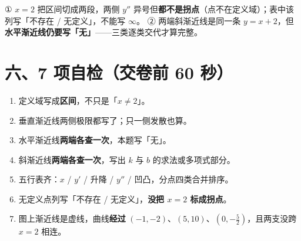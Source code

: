 \documentclass[11pt,a4paper]{ctexart}
\begin{document}
\begin{keypoint}[本题两个必踩的给分点]
① $x=2$ 把区间切成两段，两侧 $y''$ 异号但\textbf{都不是拐点}（点不在定义域）；表中该列写「不存在 / 无定义」，不能写 $\infty$。
② 两端斜渐近线是同一条 $y=x+2$，但\textbf{水平渐近线仍要写「无」}——三类逐类交代才算完整。
\end{keypoint}

\section{六、7 项自检（交卷前 60 秒）}

\begin{enumerate}[leftmargin=1.9em,itemsep=1pt]
\item[$\square$] 定义域写成\textbf{区间}，不只是「$x\ne2$」。
\item[$\square$] 垂直渐近线两侧极限都写了；只一侧发散也算。
\item[$\square$] 水平渐近线\textbf{两端各查一次}，本题写「无」。
\item[$\square$] 斜渐近线\textbf{两端各查一次}，写出 $k$ 与 $b$ 的求法或多项式部分。
\item[$\square$] 五行表齐：$x$ / $y'$ / 升降 / $y''$ / 凹凸，分点四类合并排序。
\item[$\square$] 无定义点列写「不存在 / 无定义」，\textbf{没把 $x=2$ 标成拐点}。
\item[$\square$] 图上渐近线是虚线，曲线\textbf{经过} $(-1,-2)$、$(5,10)$、$(0,-\frac52)$，且两支没跨 $x=2$ 相连。
\end{enumerate}

\vspace{6pt}
\end{document}
